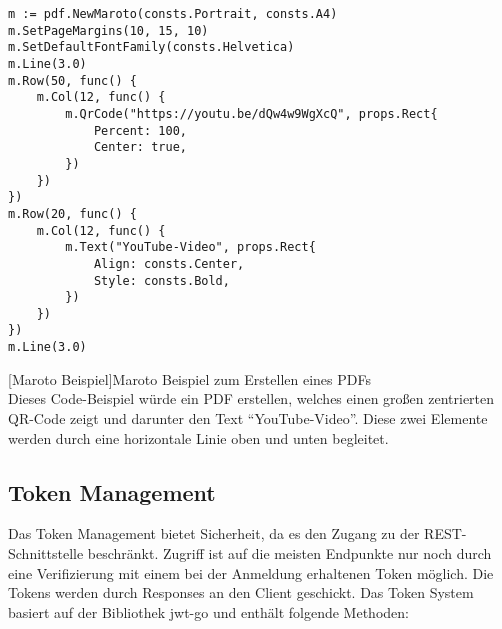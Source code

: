 \begin{verbatim}
m := pdf.NewMaroto(consts.Portrait, consts.A4)
m.SetPageMargins(10, 15, 10)
m.SetDefaultFontFamily(consts.Helvetica)
m.Line(3.0)
m.Row(50, func() {
	m.Col(12, func() {
		m.QrCode("https://youtu.be/dQw4w9WgXcQ", props.Rect{
			Percent: 100,
			Center: true,
		})
	})
})
m.Row(20, func() {
	m.Col(12, func() {
		m.Text("YouTube-Video", props.Rect{
			Align: consts.Center,
			Style: consts.Bold,
		})
	})
})
m.Line(3.0)
\end{verbatim}
[Maroto Beispiel]{Maroto Beispiel zum Erstellen eines PDFs \cite{marotoart}}
~\\
Dieses Code-Beispiel würde ein PDF erstellen, welches einen großen zentrierten QR-Code zeigt und darunter den Text \enquote{YouTube-Video}. \cite{maroto} Diese zwei Elemente werden durch eine horizontale Linie oben und unten begleitet.

\newpage
\subsection{Token Management}

Das Token Management bietet Sicherheit, da es den Zugang zu der REST-Schnittstelle beschränkt. \cite{jwt-go} \cite{tokenmanager} Zugriff ist auf die meisten Endpunkte nur noch durch eine Verifizierung mit einem bei der Anmeldung erhaltenen Token möglich. Die Tokens werden durch Responses an den Client geschickt. Das Token System basiert auf der Bibliothek jwt-go und enthält folgende Methoden:

